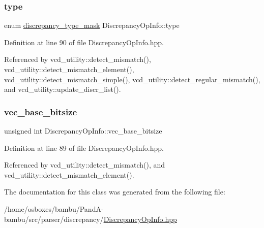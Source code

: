 \subsubsection{\texorpdfstring{type}{type}}
{\footnotesize\ttfamily enum \hyperlink{DiscrepancyOpInfo_8hpp_ae95cd44b11919bdb0ddc5eb2dbe46e09}{discrepancy\+\_\+type\+\_\+mask} Discrepancy\+Op\+Info\+::type}



Definition at line 90 of file Discrepancy\+Op\+Info.\+hpp.



Referenced by vcd\+\_\+utility\+::detect\+\_\+mismatch(), vcd\+\_\+utility\+::detect\+\_\+mismatch\+\_\+element(), vcd\+\_\+utility\+::detect\+\_\+mismatch\+\_\+simple(), vcd\+\_\+utility\+::detect\+\_\+regular\+\_\+mismatch(), and vcd\+\_\+utility\+::update\+\_\+discr\+\_\+list().

\mbox{\label{classDiscrepancyOpInfo_acdb7eeecd6adf54bbfff9ec0336d9aa6}} 
\subsubsection{\texorpdfstring{vec\+\_\+base\+\_\+bitsize}{vec\_base\_bitsize}}
{\footnotesize\ttfamily unsigned int Discrepancy\+Op\+Info\+::vec\+\_\+base\+\_\+bitsize}



Definition at line 89 of file Discrepancy\+Op\+Info.\+hpp.



Referenced by vcd\+\_\+utility\+::detect\+\_\+mismatch(), and vcd\+\_\+utility\+::detect\+\_\+mismatch\+\_\+element().



The documentation for this class was generated from the following file\+:\begin{DoxyCompactItemize}
\item 
/home/osboxes/bambu/\+Pand\+A-\/bambu/src/parser/discrepancy/\hyperlink{DiscrepancyOpInfo_8hpp}{Discrepancy\+Op\+Info.\+hpp}\end{DoxyCompactItemize}
